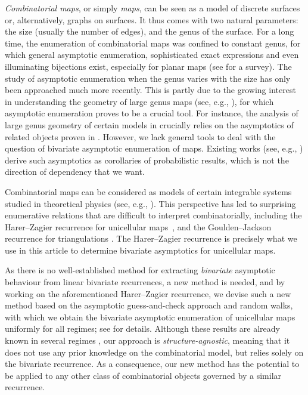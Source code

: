 \documentclass[a4paper,12pt]{article}
\theoremstyle{definition}
\begin{document}
\emph{Combinatorial maps}, or simply \emph{maps}, can be seen as a model of discrete surfaces or, alternatively, graphs on surfaces. It thus comes with two natural parameters: the size (usually the number of edges), and the genus of the surface. For a long time, the enumeration of combinatorial maps was confined to constant genus, for which general asymptotic enumeration, sophisticated exact expressions and even illuminating bijections exist, especially for planar maps (see \cite{planar-map-survey} for a survey). The study of asymptotic enumeration when the genus varies with the size has only been approached much more recently. This is partly due to the growing interest in understanding the geometry of {large genus }maps (see, e.g., \cite{budzinski-louf,DGZZ}), for which asymptotic enumeration proves to be a crucial tool. For instance, the analysis of large genus geometry of certain models in \cite{DGZZ} crucially relies on the asymptotics of related objects proven in \cite{Agg}. However, we lack general tools to deal with the question of bivariate asymptotic enumeration of maps. Existing works (see, e.g., \cite{budzinski-louf,meso-genus,linear-genus}) derive such asymptotics as corollaries of probabilistic results, which is not the direction of dependency that we want.

Combinatorial maps can be considered as models of certain integrable systems studied in theoretical physics (see, e.g., \cite{LandoZvonkine}). This perspective has led to surprising enumerative relations that are difficult to interpret combinatorially, including the Harer--Zagier recurrence for unicellular maps~\cite{HarerZagier1986Euler}, and the Goulden--Jackson recurrence for triangulations \cite{KP-triangulation}. The Harer--Zagier recurrence is precisely what we use in this article to determine bivariate asymptotics for unicellular maps.


As there is no well-established method for extracting \emph{bivariate} asymptotic behaviour from linear bivariate recurrences, a new method is needed, and by working on the aforementioned Harer--Zagier recurrence, we devise such a new method based on the asymptotic guess-and-check approach and random walks, with which we obtain the bivariate asymptotic enumeration of unicellular maps uniformly for all regimes; see  for details. Although these results are already known in several regimes \cite{meso-genus,linear-genus}, our approach is \emph{structure-agnostic}, meaning that it does not use any prior knowledge on the combinatorial model, but relies solely on the bivariate recurrence. As a consequence, our new method has the potential to be applied to any other class of combinatorial objects governed by a similar recurrence.
\end{document}
